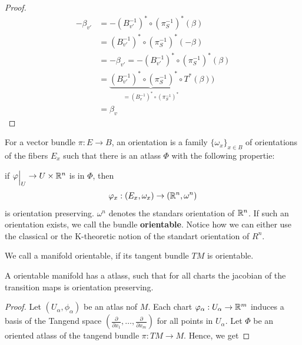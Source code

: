 \begin{proof}
\begin{align*}
    -\beta_{v'} 
    &= -(B_{v'}^{-1})^*\circ (\pi^{-1}_S)^*(\beta) \\
    &= (B_{v'}^{-1})^*\circ (\pi^{-1}_S)^*(-\beta)\\
    &= -\beta_{v'}=-(B_{v'}^{-1})^*\circ (\pi^{-1}_S)^*(\beta)\\
    &= \underbrace{(B_{v'}^{-1})^*\circ (\pi^{-1}_S)^*\circ T^*}_{=(B_{v}^{-1})^*\circ (\pi^{-1}_S)^*}(\beta))\\
    &= \beta_v
\end{align*}
\end{proof}
\begin{definition}
For a  vector bundle $\pi:E\to B$, an orientation is a family $\{ \omega_x \}_{x\in B}$ of orientations of the fibers $E_x$ such that there is an atlass $\Phi$ with the following propertie:

if $\phi \einsch{U}\to U\times \R^n$ is in $\Phi$, then 
\begin{align*}
	\varphi_x : (E_x,\omega_x) \to (\mathbb{R}^n,\omega^n)
\end{align*} is orientation preserving. $\omega^n$ denotes the standars orientation of $\mathbb{R}^n$. If such an orientation exists, we call the bundle \textbf{orientable}. Notice how we can either use the classical or the K-theoretic notion of the standart orientation of $R^n$. 
\end{definition}
\begin{definition}
	We call a manifold orientable, if its tangent bundle $TM$ is orientable. 
\end{definition}
\begin{corollary}
	A orientable manifold has a atlass, such that for all charts the jacobian of the transition maps is orientation preserving.
\end{corollary}
\begin{proof}
	Let $(U_{\alpha},\phi_\alpha)$ be an atlas nof $M$. Each chart $\varphi_\alpha:U_\alpha \to \mathbb{R}^m$ induces a basis of the Tangend space $(\frac{\partial}{\partial x_1},\dots , \frac{\partial}{\partial x_m})$ for all points in $U_\alpha$.  	
	Let $\Phi$ be an oriented atlass of the tangend bundle $\pi:TM\to M$. Hence, we get 
\end{proof}